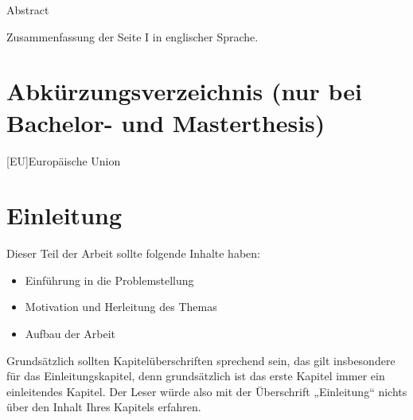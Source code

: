 \documentclass[12pt, oneside]{article}
\begin{document}
\Zusammenfassung
{Abstract}
{
Zusammenfassung der Seite I in englischer Sprache.

}


\tableofcontents



\newpage

\listoffigures
{}%



\newpage

%
\listoftables


\newpage

\section*{Abkürzungsverzeichnis (nur bei Bachelor- und Masterthesis)}
%


\begin{acronym}[ECU]
[EU]{Europäische Union}
\end{acronym}



\newpage
{}
\setcounter{page}{1}
  
  


\section{Einleitung} \label{einleitung}
Dieser Teil der Arbeit sollte folgende Inhalte haben:
\begin{itemize}
    \item Einführung in die Problemstellung
    \item Motivation und Herleitung des Themas
    \item Aufbau der Arbeit
\end{itemize}
Grundsätzlich sollten Kapitelüberschriften sprechend sein, das gilt insbesondere für das Einleitungskapitel, denn grundsätzlich ist das erste Kapitel immer ein einleitendes Kapitel. Der Leser würde also mit der Überschrift „Einleitung“ nichts über den Inhalt Ihres Kapitels erfahren. 
\end{document}
